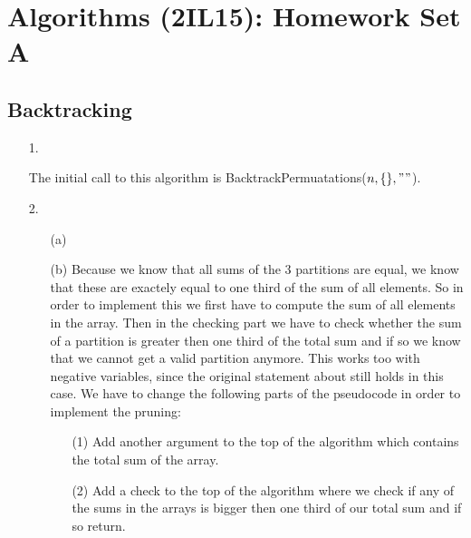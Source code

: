 \documentclass{article}
\title{}
\author{Mart Pluijmaekers}
\date{19-11-2012}
\begin{document}
\section*{Algorithms (2IL15): Homework Set A}

\subsection*{Backtracking}
\begin{itemize}
\item[1.]\begin{algorithmic}[1]
\ENDIF
{}
	\ENDIF
\ENDFOR
\end{algorithmic}
The initial call to this algorithm is BacktrackPermuatations($n, \{\}, ""$).

\item[2.] 
\begin{itemize}

\item[(a)]\begin{algorithmic}[1]
	\RETURN{\TRUE}
\ENDIF
{}
\ENDFOR
\end{algorithmic}


\item[(b)] Because we know that all sums of the 3 partitions are equal, we know that these are exactely equal to one third of the sum of all elements. So in order to implement this we first have to compute the sum of all elements in the array. Then in the checking part we have to check whether the sum of a partition is greater then one third of the total sum and if so we know that we cannot get a valid partition anymore. This works too with negative variables, since the original statement about still holds in this case. We have to change the following parts of the pseudocode in order to implement the pruning: \begin{itemize}
\item[(1)] Add another argument to the top of the algorithm which contains the total sum of the array.
\item[(2)] Add a check to the top of the algorithm where we check if any of the sums in the arrays is bigger then one third of our total sum and if so return.
\end{itemize}
\end{itemize}
\end{itemize}
\end{document}
